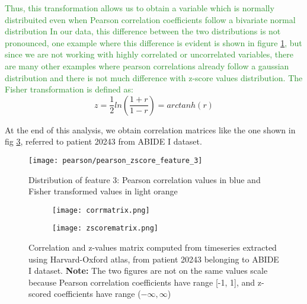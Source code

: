 \documentclass[11pt]{report}
\begin{document}
\textcolor{ForestGreen}{
Thus, this transformation allows us to obtain a variable which is normally distribuited even when Pearson correlation coefficients follow a bivariate normal distribution
In our data, this difference between the two distributions is not pronounced, one example where this difference is evident is shown in figure \ref{fig:pearson_zscore_distribution_3}, but since we are not working with highly correlated or uncorrelated variables, there are many other examples where pearson correlations already follow a gaussian distribution and there is not much difference with z-score values distribution.
The Fisher transformation is defined as:
}
\begin{equation}
z = \frac{1}{2}ln\left(\frac{1+r}{1-r}\right) = arctanh(r)
\end{equation}

At the end of this analysis, we obtain correlation matrices like the one shown in fig \ref{fig:corrmatrices}, referred to patient 20243 from ABIDE I dataset.


\begin{figure}[h!]
\centering
\texttt{[image: pearson/pearson\_zscore\_feature\_3]}
\caption{Distribution of feature 3: Pearson correlation values in blue and Fisher transformed values in light orange}
\label{fig:pearson_zscore_distribution_3}
\end{figure}


\begin{figure}
\begin{subfigure}{0.5\textwidth}
\texttt{[image: corrmatrix.png]}
\caption{}
\label{ref:corrmatrix}
\end{subfigure}
\begin{subfigure}{0.5\textwidth}
\texttt{[image: zscorematrix.png]}
\end{subfigure}
\caption{Correlation and z-values matrix computed from timeseries extracted using Harvard-Oxford atlas, from patient 20243 belonging to ABIDE I dataset. \textbf{Note:} The two figures are not on the same values scale because Pearson correlation coefficients have range [-1, 1], and z-scored coefficients have range ($-\infty,\infty$)}
\label{fig:corrmatrices}
\end{figure}
\end{document}
